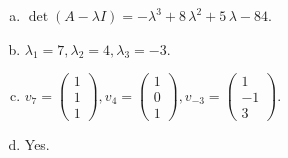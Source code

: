 \begin{questions}
\begin{solution}
\begin{enumerate}[(a)]
\item $\det(A-\lambda I)=-{\lambda}^{3} + 8 \, {\lambda}^{2} + 5 \, {\lambda} - 84$.
\item ${\lambda}_1=7, {\lambda}_2=4, {\lambda}_3=-3$.
\item $v_{7}=\left(\begin{array}{r}
1 \\
1 \\
1
\end{array}\right), v_{4}=\left(\begin{array}{r}
1 \\
0 \\
1
\end{array}\right), v_{-3}=\left(\begin{array}{r}
1 \\
-1 \\
3
\end{array}\right)$.
\item Yes.
\end{enumerate}
\end{solution}

\end{questions}

\newpage


\begin{center}
\end{center}

